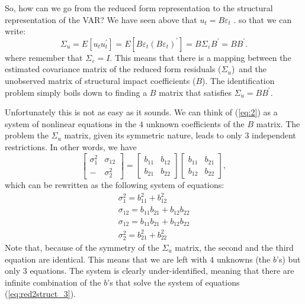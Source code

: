 \documentclass[10pt]{article}
\begin{document}
So, how can we go from the reduced form representation to the structural
representation of the VAR? We have seen above that $u_{t}=B\varepsilon _{t}$%
. so that we can write:%
\begin{equation}
\Sigma _{u}=E\left[ u_{t}u_{t}^{\prime }\right] =E\left[ B\varepsilon
_{t}\left( B\varepsilon _{t}\right) ^{\prime }\right] =B\Sigma _{\varepsilon
}B^{\prime }=BB^{\prime }.  \label{eq:red2struct_1}
\end{equation}%
where remember that $\Sigma _{\varepsilon }=I$. This means that there is a
mapping between the estimated covariance matrix of the reduced form
residuals ($\Sigma _{u}$)\ and the unobserved matrix of structural impact
coefficients ($B$). The identification problem simply boils down to finding
a $B$ matrix that satisfies $\Sigma _{u}=BB^{\prime }$.

Unfortunately this is not as easy as it sounds. We can think of (\ref{eq:2})
as a system of nonlinear equations in the $4$ unknown coefficients of the $B$
matrix. The problem the $\Sigma _{u}$ matrix, given its symmetric nature,
leads to only $3$ independent restrictions. In other words, we have 
\begin{equation}
\left[ 
\begin{array}{cc}
\sigma _{1}^{2} & \sigma _{12} \\ 
- & \sigma _{2}^{2}%
\end{array}%
\right] =\left[ 
\begin{array}{cc}
b_{11} & b_{12} \\ 
b_{21} & b_{22}%
\end{array}%
\right] \left[ 
\begin{array}{cc}
b_{11} & b_{21} \\ 
b_{12} & b_{22}%
\end{array}%
\right] ,  \label{eq:red2struct_2}
\end{equation}%
which can be rewritten as the following system of equations:%
\begin{equation}
\begin{array}{l}
\sigma _{1}^{2}=b_{11}^{2}+b_{12}^{2} \\ 
\sigma _{12}=b_{11}b_{21}+b_{12}b_{22} \\ 
\sigma _{12}=b_{11}b_{21}+b_{12}b_{22} \\ 
\sigma _{2}^{2}=b_{21}^{2}+b_{22}^{2}%
\end{array}
\label{eq:red2struct_3}
\end{equation}%
Note that, because of the symmetry of the $\Sigma _{u}$ matrix, the second
and the third equation are identical. This means that we are left with $4$
unknowns (the $b$'s) but only $3$ equations. The system is clearly
under-identified, meaning that there are infinite combination of the $b$'s
that solve the system of equations (\ref{eq:red2struct_3}).
\end{document}
